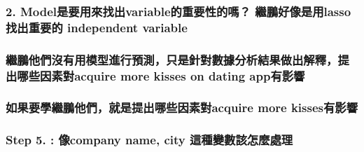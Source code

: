 \documentclass[
]{article}
\begin{document}
\hypertarget{modelux662fux8981ux7528ux4f86ux627eux51favariableux7684ux91cdux8981ux6027ux7684ux55ce-ux7e7cux9d6cux597dux50cfux662fux7528lasso-ux627eux51faux91cdux8981ux7684-independent-variable}{%
\subsubsection{2. Model是要用來找出variable的重要性的嗎？
繼鵬好像是用lasso 找出重要的 independent
variable}\label{modelux662fux8981ux7528ux4f86ux627eux51favariableux7684ux91cdux8981ux6027ux7684ux55ce-ux7e7cux9d6cux597dux50cfux662fux7528lasso-ux627eux51faux91cdux8981ux7684-independent-variable}}

\hypertarget{ux7e7cux9d6cux4ed6ux5011ux6c92ux6709ux7528ux6a21ux578bux9032ux884cux9810ux6e2cux53eaux662fux91ddux5c0dux6578ux64daux5206ux6790ux7d50ux679cux505aux51faux89e3ux91cbux63d0ux51faux54eaux4e9bux56e0ux7d20ux5c0dacquire-more-kisses-on-dating-appux6709ux5f71ux97ff}{%
\subsubsection{繼鵬他們沒有用模型進行預測，只是針對數據分析結果做出解釋，提出哪些因素對acquire
more kisses on dating
app有影響}\label{ux7e7cux9d6cux4ed6ux5011ux6c92ux6709ux7528ux6a21ux578bux9032ux884cux9810ux6e2cux53eaux662fux91ddux5c0dux6578ux64daux5206ux6790ux7d50ux679cux505aux51faux89e3ux91cbux63d0ux51faux54eaux4e9bux56e0ux7d20ux5c0dacquire-more-kisses-on-dating-appux6709ux5f71ux97ff}}

\hypertarget{ux5982ux679cux8981ux5b78ux7e7cux9d6cux4ed6ux5011ux5c31ux662fux63d0ux51faux54eaux4e9bux56e0ux7d20ux5c0dacquire-more-kissesux6709ux5f71ux97ff}{%
\subsubsection{如果要學繼鵬他們，就是提出哪些因素對acquire more
kisses有影響}\label{ux5982ux679cux8981ux5b78ux7e7cux9d6cux4ed6ux5011ux5c31ux662fux63d0ux51faux54eaux4e9bux56e0ux7d20ux5c0dacquire-more-kissesux6709ux5f71ux97ff}}

\hypertarget{step-5.-ux50cfcompany-name-city-ux9019ux7a2eux8b8aux6578ux8a72ux600eux9ebcux8655ux7406}{%
\subsubsection{Step 5. : 像company name, city
這種變數該怎麼處理}\label{step-5.-ux50cfcompany-name-city-ux9019ux7a2eux8b8aux6578ux8a72ux600eux9ebcux8655ux7406}}
\end{document}
